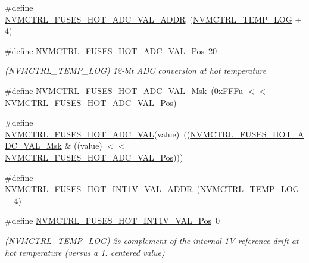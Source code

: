 \begin{DoxyCompactItemize}
\item 
\#define \mbox{\hyperlink{group__fuses__api_ga250363970227949f6707a9f320906a39}{N\+V\+M\+C\+T\+R\+L\+\_\+\+F\+U\+S\+E\+S\+\_\+\+H\+O\+T\+\_\+\+A\+D\+C\+\_\+\+V\+A\+L\+\_\+\+A\+D\+DR}}~(\mbox{\hyperlink{group___s_a_m_d21_j18_a__base_gae900d443ec6d7cf1c90d21b6662fa447}{N\+V\+M\+C\+T\+R\+L\+\_\+\+T\+E\+M\+P\+\_\+\+L\+OG}} + 4)
\item 
\#define \mbox{\hyperlink{group__fuses__api_gaac9fd382f744bac789208a43215a0392}{N\+V\+M\+C\+T\+R\+L\+\_\+\+F\+U\+S\+E\+S\+\_\+\+H\+O\+T\+\_\+\+A\+D\+C\+\_\+\+V\+A\+L\+\_\+\+Pos}}~20
\begin{DoxyCompactList}\small\item\em (N\+V\+M\+C\+T\+R\+L\+\_\+\+T\+E\+M\+P\+\_\+\+L\+OG) 12-\/bit A\+DC conversion at hot temperature \end{DoxyCompactList}\item 
\#define \mbox{\hyperlink{group__fuses__api_gab61955d82cacb5aba01b14d41ce77057}{N\+V\+M\+C\+T\+R\+L\+\_\+\+F\+U\+S\+E\+S\+\_\+\+H\+O\+T\+\_\+\+A\+D\+C\+\_\+\+V\+A\+L\+\_\+\+Msk}}~(0x\+F\+F\+Fu $<$$<$ N\+V\+M\+C\+T\+R\+L\+\_\+\+F\+U\+S\+E\+S\+\_\+\+H\+O\+T\+\_\+\+A\+D\+C\+\_\+\+V\+A\+L\+\_\+\+Pos)
\item 
\#define \mbox{\hyperlink{group__fuses__api_gad0bdca247d24909d344b5da3ec380694}{N\+V\+M\+C\+T\+R\+L\+\_\+\+F\+U\+S\+E\+S\+\_\+\+H\+O\+T\+\_\+\+A\+D\+C\+\_\+\+V\+AL}}(value)~((\mbox{\hyperlink{group__fuses__api_gab61955d82cacb5aba01b14d41ce77057}{N\+V\+M\+C\+T\+R\+L\+\_\+\+F\+U\+S\+E\+S\+\_\+\+H\+O\+T\+\_\+\+A\+D\+C\+\_\+\+V\+A\+L\+\_\+\+Msk}} \& ((value) $<$$<$ \mbox{\hyperlink{group__fuses__api_gaac9fd382f744bac789208a43215a0392}{N\+V\+M\+C\+T\+R\+L\+\_\+\+F\+U\+S\+E\+S\+\_\+\+H\+O\+T\+\_\+\+A\+D\+C\+\_\+\+V\+A\+L\+\_\+\+Pos}})))
\item 
\#define \mbox{\hyperlink{group__fuses__api_ga36366a3b37f567b131a80d29c9889940}{N\+V\+M\+C\+T\+R\+L\+\_\+\+F\+U\+S\+E\+S\+\_\+\+H\+O\+T\+\_\+\+I\+N\+T1\+V\+\_\+\+V\+A\+L\+\_\+\+A\+D\+DR}}~(\mbox{\hyperlink{group___s_a_m_d21_j18_a__base_gae900d443ec6d7cf1c90d21b6662fa447}{N\+V\+M\+C\+T\+R\+L\+\_\+\+T\+E\+M\+P\+\_\+\+L\+OG}} + 4)
\item 
\#define \mbox{\hyperlink{group__fuses__api_gad1b7b3b85a3a761b154b59975f5de897}{N\+V\+M\+C\+T\+R\+L\+\_\+\+F\+U\+S\+E\+S\+\_\+\+H\+O\+T\+\_\+\+I\+N\+T1\+V\+\_\+\+V\+A\+L\+\_\+\+Pos}}~0
\begin{DoxyCompactList}\small\item\em (N\+V\+M\+C\+T\+R\+L\+\_\+\+T\+E\+M\+P\+\_\+\+L\+OG) 2\textquotesingle{}s complement of the internal 1V reference drift at hot temperature (versus a 1. centered value) \end{DoxyCompactList}\item 

\end{DoxyCompactItemize}
